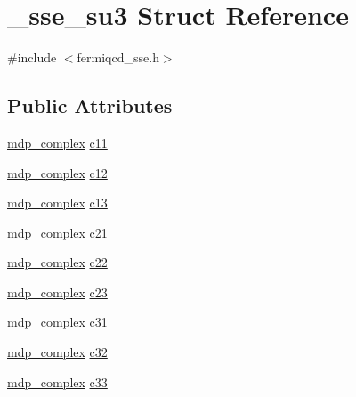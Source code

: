 \hypertarget{struct__sse__su3}{
\section{\_\-sse\_\-su3 Struct Reference}
\label{struct__sse__su3}
}


{\ttfamily \#include $<$fermiqcd\_\-sse.h$>$}\subsection*{Public Attributes}
\begin{DoxyCompactItemize}
\item 
\hyperlink{classmdp__complex}{mdp\_\-complex} \hyperlink{struct__sse__su3_af55be7065f13472fda37c8fcd2cc13fc}{c11}
\item 
\hyperlink{classmdp__complex}{mdp\_\-complex} \hyperlink{struct__sse__su3_af5c46405e327d5d69cb30acf0e13bc16}{c12}
\item 
\hyperlink{classmdp__complex}{mdp\_\-complex} \hyperlink{struct__sse__su3_af320878329a13e1dc357aa1a28dce02c}{c13}
\item 
\hyperlink{classmdp__complex}{mdp\_\-complex} \hyperlink{struct__sse__su3_a3e1322a7b60971c25a83568bde448214}{c21}
\item 
\hyperlink{classmdp__complex}{mdp\_\-complex} \hyperlink{struct__sse__su3_a59599dda56e3e1492f0182270f4f344d}{c22}
\item 
\hyperlink{classmdp__complex}{mdp\_\-complex} \hyperlink{struct__sse__su3_a46ef8494dbb33bf1476b23a1d6e664f4}{c23}
\item 
\hyperlink{classmdp__complex}{mdp\_\-complex} \hyperlink{struct__sse__su3_ab826e31a499129f70ffa3c13df54445d}{c31}
\item 
\hyperlink{classmdp__complex}{mdp\_\-complex} \hyperlink{struct__sse__su3_a1ca57b8c0a62903f88d2e932aca89427}{c32}
\item 
\hyperlink{classmdp__complex}{mdp\_\-complex} \hyperlink{struct__sse__su3_ae85e43ae178100b4053d1c811c2d66ee}{c33}
\end{DoxyCompactItemize}


